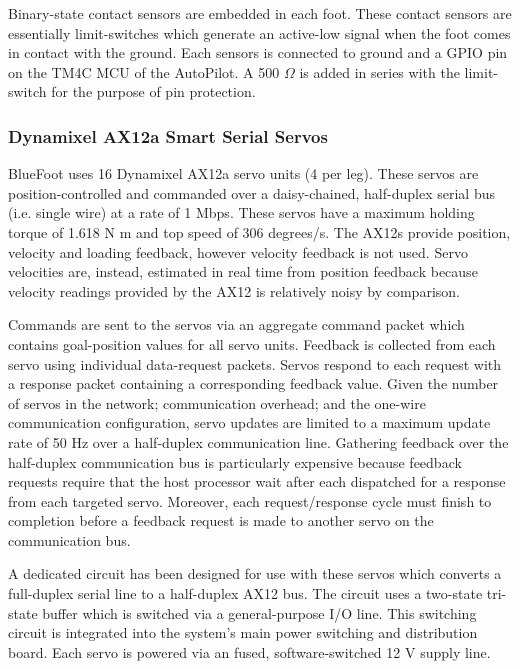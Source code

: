 				Binary-state contact sensors are embedded in each foot. These contact sensors are essentially limit-switches which generate an active-low signal when the foot comes in contact with the ground. Each sensors is connected to ground and a GPIO pin on the TM4C MCU of the AutoPilot. A 500 $\Omega$ is added in series with the limit-switch for the purpose of pin protection.

			\subsubsection{Dynamixel AX12a Smart Serial Servos}

				BlueFoot uses 16 Dynamixel AX12a servo units (4 per leg). These servos are position-controlled and commanded over a daisy-chained, half-duplex serial bus (i.e. single wire) at a rate of 1 Mbps. These servos have a maximum holding torque of 1.618 N m and top speed of 306 degrees/s. The AX12s provide position, velocity and loading feedback, however velocity feedback is not used. Servo velocities are, instead, estimated in real time from position feedback because velocity readings provided by the AX12 is relatively noisy by comparison. 

				Commands are sent to the servos via an aggregate command packet which contains goal-position values for all servo units. Feedback is collected from each servo using individual data-request packets. Servos respond to each request with a response packet containing a corresponding feedback value. Given the number of servos in the network; communication overhead; and the one-wire communication configuration, servo updates are limited to a maximum update rate of 50 Hz over a half-duplex communication line. Gathering feedback over the half-duplex communication bus is particularly expensive because feedback requests require that the host processor wait after each dispatched for a response from each targeted servo. Moreover, each request/response cycle must finish to completion before a feedback request is made to another servo on the communication bus.

				A dedicated circuit has been designed for use with these servos which converts a full-duplex serial line to a half-duplex AX12 bus. The circuit uses a two-state tri-state buffer which is switched via a general-purpose I/O line. This switching circuit is integrated into the system's main power switching and distribution board. Each servo is powered via an fused, software-switched 12 V supply line.


